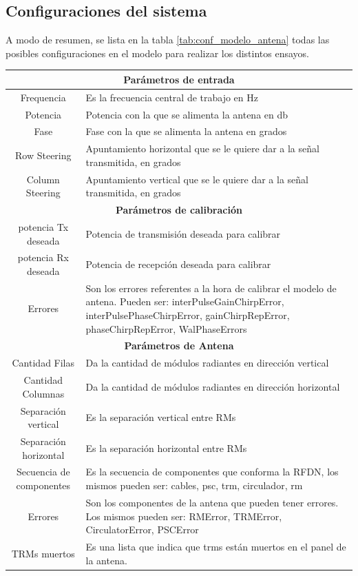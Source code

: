 \subsection{Configuraciones del sistema}

A modo de resumen, se lista en la tabla \ref{tab:conf_modelo_antena} todas las posibles configuraciones en el modelo para 
realizar los distintos ensayos.

\begin{center}
  \footnotesize
  \centering
  \begin{longtable}{|c|p{9cm}|}
    \hline 
	\multicolumn{2}{|c|}{\textbf{Parámetros de entrada}} \\ 
	\hline
    Frequencia		& Es la frecuencia central de trabajo en Hz \tabularnewline \hline 
    Potencia		& Potencia con la que se alimenta la antena en db \tabularnewline \hline 
    Fase			& Fase con la que se alimenta la antena en grados \tabularnewline \hline 
    Row Steering	& Apuntamiento horizontal que se le quiere dar a la señal transmitida, en grados  \tabularnewline \hline 
    Column Steering	& Apuntamiento vertical que se le quiere dar a la señal transmitida, en grados  \tabularnewline \hline 
	\multicolumn{2}{|c|}{\textbf{Parámetros de calibración}} \\ 
	\hline
	potencia Tx deseada	& Potencia de transmisión deseada para calibrar  \tabularnewline \hline 
	potencia Rx deseada	& Potencia de recepción deseada para calibrar  \tabularnewline \hline 
	Errores	& Son los errores referentes a la hora de calibrar el modelo de antena. Pueden ser: interPulseGainChirpError, 
	interPulsePhaseChirpError, gainChirpRepError, phaseChirpRepError, WalPhaseErrors  \tabularnewline \hline
	\multicolumn{2}{|c|}{\textbf{Parámetros de Antena}} \\ 
	\hline
	Cantidad Filas	& Da la cantidad de módulos radiantes en dirección vertical \tabularnewline \hline 
	Cantidad Columnas	& Da la cantidad de módulos radiantes en dirección horizontal \tabularnewline \hline 
	Separación vertical & Es la separación vertical entre RMs \tabularnewline \hline 
	Separación horizontal & Es la separación horizontal entre RMs \tabularnewline \hline 
	Secuencia de componentes & Es la secuencia de componentes que conforma la RFDN, los mismos pueden ser: cables, psc, trm, circulador, rm \tabularnewline \hline 
	Errores  & Son los componentes de la antena que pueden tener errores. Los mismos pueden ser: RMError, TRMError, CirculatorError, PSCError \tabularnewline \hline 
	TRMs muertos & Es una lista que indica que trms están muertos en el panel de la antena. \tabularnewline \hline 

\end{longtable}
\end{center}
